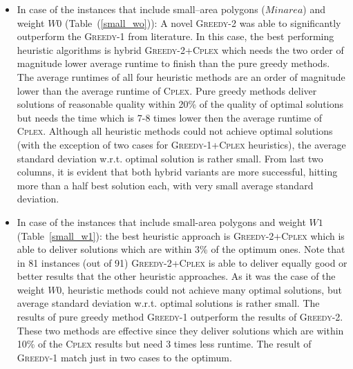 \documentclass[runningheads,a4paper]{elsarticle}
\begin{document}
     \begin{itemize}
     	\item  In case of the instances that include small--area polygons ($Minarea$) and weight $W0$ (Table~(\ref{small_wo})): A novel \textsc{Greedy-2} was able to significantly outperform the \textsc{Greedy-1} from literature. In this case, the best performing heuristic algorithms is hybrid \textsc{Greedy-2+Cplex} which needs the two order of magnitude lower average runtime to finish than the pure greedy methods. The average runtimes of all four heuristic methods are an order of magnitude lower than the average runtime of \textsc{Cplex}. Pure greedy methods deliver solutions of reasonable quality within 20\% of the quality of optimal solutions but needs the time which is 7-8 times lower then the average runtime of \textsc{Cplex}. Although all heuristic methods could not achieve optimal solutions (with the exception of two cases for \textsc{Greedy-1+Cplex} heuristics), the average standard deviation w.r.t. optimal solution is rather small. From last two columns, it is evident that both hybrid variants are more successful, hitting more than a half best solution each, with very small average standard deviation. 
     	\item  In case of the instances that include small-area polygons and weight $W1$ (Table~\ref{small_w1}): the best heuristic approach is \textsc{Greedy-2+Cplex} which is able to deliver solutions which are within 3\% of the optimum ones. Note that in 81 instances (out of 91) \textsc{Greedy-2+Cplex} is able to deliver equally good or better results that the other heuristic approaches. As it was the case  of the weight $W0$, heuristic methods could not achieve many optimal solutions, but average standard deviation w.r.t. optimal solutions is rather small.
     	The results of pure greedy method \textsc{Greedy-1} outperform the results of \textsc{Greedy-2}. These two methods are effective since they deliver solutions which are within 10\% of the \textsc{Cplex} results but need 3 times less runtime. The result of \textsc{Greedy-1} match just in two cases to the optimum. 
     	

\end{itemize}
\end{document}
